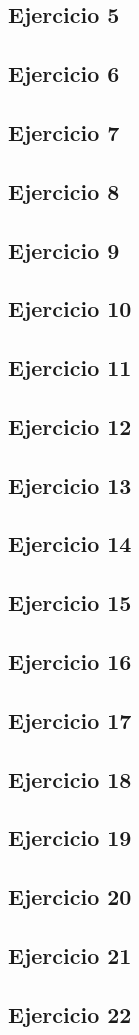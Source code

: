\documentclass[10pt,a4paper]{article}
\begin{document}
  \subsection{Ejercicio 5}
  \subsection{Ejercicio 6}
  \subsection{Ejercicio 7}
  \subsection{Ejercicio 8}
  \subsection{Ejercicio 9}
  \subsection{Ejercicio 10}
  \subsection{Ejercicio 11}
  \subsection{Ejercicio 12}
  \subsection{Ejercicio 13}
  \subsection{Ejercicio 14}
  \subsection{Ejercicio 15}
  \subsection{Ejercicio 16}
  \subsection{Ejercicio 17}
  \subsection{Ejercicio 18}
  \subsection{Ejercicio 19}
  \subsection{Ejercicio 20}
  \subsection{Ejercicio 21}
  \subsection{Ejercicio 22}
\end{document}
